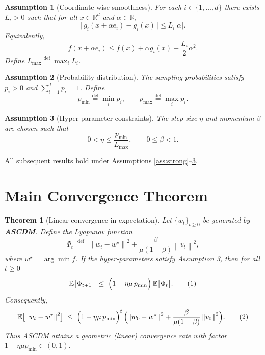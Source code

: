 \documentclass{article}
\newtheorem{theorem}{Theorem}
\newtheorem{assumption}{Assumption}
\newcommand{\E}{\mathbb{E}}
\newcommand{\R}{\mathbb{R}}
\newcommand{\norm}[1]{\left\|#1\right\|}
\begin{document}
\begin{assumption}[Coordinate‑wise smoothness]\label{ass:smooth}
For each $i\in\{1,\dots,d\}$ there exists $L_i>0$ such that for all $x\in\R^{d}$ and $\alpha\in\R$,
\[
\bigl|\,g_i(x+\alpha e_i)-g_i(x)\,\bigr|\le L_i|\alpha|.
\]
Equivalently,
\[
f(x+\alpha e_i)\le f(x)+\alpha g_i(x)+\frac{L_i}{2}\alpha^{2}.
\]
Define $L_{\max}\stackrel{\text{def}}{=}\max_i L_i$.
\end{assumption}

\begin{assumption}[Probability distribution]\label{ass:prob}
The sampling probabilities satisfy $p_i>0$ and $\sum_{i=1}^{d}p_i=1$.
Define
\[
p_{\min}\stackrel{\text{def}}{=}\min_{i}p_i,\qquad
p_{\max}\stackrel{\text{def}}{=}\max_{i}p_i .
\]
\end{assumption}

\begin{assumption}[Hyper‑parameter constraints]\label{ass:hp}
The step size $\eta$ and momentum $\beta$ are chosen such that
\[
0<\eta\le \frac{p_{\min}}{L_{\max}},\qquad 0\le\beta<1.
\]
\end{assumption}

All subsequent results hold under Assumptions \ref{ass:strong}–\ref{ass:hp}.

\section*{Main Convergence Theorem}
\begin{theorem}[Linear convergence in expectation]\label{thm:linear}
Let $\{w_t\}_{t\ge0}$ be generated by \textbf{ASCDM}.  
Define the Lyapunov function
\[
\Phi_t\;\stackrel{\text{def}}{=}\;\norm{w_t-w^{\star}}^{2}+\frac{\beta}{\mu(1-\beta)}\norm{v_t}^{2},
\]
where $w^{\star}=\arg\min f$.  
If the hyper‑parameters satisfy Assumption \ref{ass:hp}, then for all $t\ge0$
\[
\E\bigl[\Phi_{t+1}\bigr]\;\le\;\Bigl(1-\eta\mu\,p_{\min}\Bigr)\,\E\bigl[\Phi_{t}\bigr].
\tag{1}
\]
Consequently,
\[
\E\bigl[\norm{w_t-w^{\star}}^{2}\bigr]\;\le\;
\Bigl(1-\eta\mu\,p_{\min}\Bigr)^{t}\,
\Bigl(\norm{w_0-w^{\star}}^{2}+\frac{\beta}{\mu(1-\beta)}\norm{v_0}^{2}\Bigr).
\tag{2}
\]
Thus ASCDM attains a geometric (linear) convergence rate with factor $1-\eta\mu p_{\min}\in(0,1)$.
\end{theorem}
\end{document}
